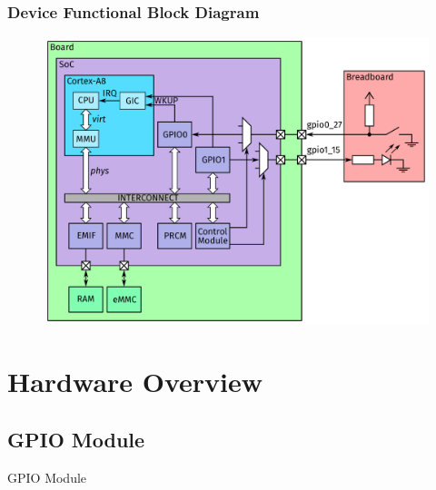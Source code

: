 \documentclass[aspectratio=169,usenames,dvipsnames]{beamer}
\begin{document}
\begin{frame}
  \frametitle{Device Functional Block Diagram}
  \vspace*{-5mm}
  \begin{figure}
    \centering
    \includegraphics[scale=0.22]{images/architecture2.pdf}
  \end{figure}
  \vspace*{-12mm}
\end{frame}

\section{Hardware Overview}

\subsection{GPIO Module}

\begin{frame}[standout]
  GPIO Module
\end{frame}
\end{document}
